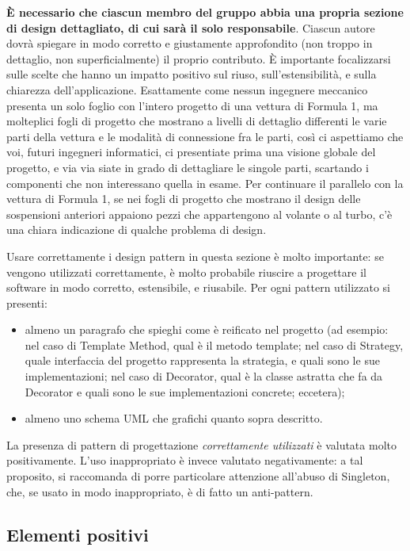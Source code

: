 \documentclass[a4paper,12pt]{report}
\begin{document}
\textbf{È necessario che ciascun membro del gruppo abbia una propria sezione di design dettagliato, 
di cui sarà il solo responsabile}.
%
Ciascun autore dovrà spiegare in modo corretto e giustamente approfondito (non troppo in dettaglio, non superficialmente) il proprio contributo.
%
È importante focalizzarsi sulle scelte che hanno un impatto positivo sul riuso, sull'estensibilità, e sulla chiarezza dell'applicazione.
%
Esattamente come nessun ingegnere meccanico presenta un solo foglio con l'intero progetto di una vettura di Formula 1, ma molteplici fogli di progetto che mostrano a livelli di dettaglio differenti le varie parti della vettura e le modalità di connessione fra le parti, così ci aspettiamo che voi, futuri ingegneri informatici, ci presentiate prima una visione globale del progetto, e via via siate in grado di dettagliare le singole parti, scartando i componenti che non interessano quella in esame.
%
Per continuare il parallelo con la vettura di Formula 1, se nei fogli di progetto che mostrano il 
design delle sospensioni anteriori appaiono pezzi che appartengono al volante o al turbo, c'è una 
chiara indicazione di qualche problema di design.

Usare correttamente i design pattern in questa sezione è molto importante: se vengono utilizzati correttamente, è molto probabile riuscire a progettare il software in modo corretto, estensibile, e riusabile.
%
Per ogni pattern utilizzato si presenti:
\begin{itemize}
    \item almeno un paragrafo che spieghi come è reificato nel progetto (ad esempio: nel caso di Template Method, qual è il metodo template; nel caso di Strategy, quale interfaccia del progetto rappresenta la strategia, e quali sono le sue implementazioni; nel caso di Decorator, qual è la classe astratta che fa da Decorator e quali sono le sue implementazioni concrete; eccetera);
    \item almeno uno schema UML che grafichi quanto sopra descritto.
\end{itemize}
%
La presenza di pattern di progettazione \emph{correttamente utilizzati} è valutata molto positivamente.
%
L'uso inappropriato è invece valutato negativamente: a tal proposito, si raccomanda di porre particolare attenzione all'abuso di Singleton, che, se usato in modo inappropriato, è di fatto un anti-pattern.

\subsection*{Elementi positivi}
\end{document}
